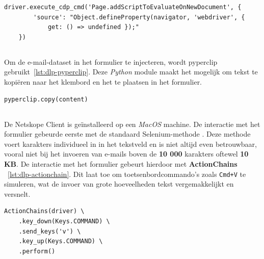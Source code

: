 \begin{lstlisting}[style=custompython,label={lst:dlp-stealth},caption={Best practice voor browserautomatisering}, captionpos=b]
    driver.execute_cdp_cmd('Page.addScriptToEvaluateOnNewDocument', {
        'source': "Object.defineProperty(navigator, 'webdriver', {
            get: () => undefined });"
    })
\end{lstlisting}

\subsection{}
\label{subsubsec:clipboard}

Om de e-mail-dataset in het formulier te injecteren, wordt pyperclip gebruikt~\ref{lst:dlp-pyperclip}.
Deze \textit{Python} module maakt het mogelijk om tekst te kopiëren naar het klembord en het te plaatsen in het formulier.

\begin{lstlisting}[style=custompython, label={lst:dlp-pyperclip}, caption={Clipboardmanipulatie met Pyperclip}, captionpos=b]
    pyperclip.copy(content)
\end{lstlisting}

\subsection{}
\label{subsubsec:gebruikersinteractie}

De Netskope Client is geïnstalleerd op een \textit{MacOS} machine. De interactie met het formulier gebeurde eerste met de standaard Selenium-methode \texttt{}. 
Deze methode voert karakters individueel in in het tekstveld en is niet altijd even betrouwbaar, vooral niet bij het invoeren van e-mails boven de \textbf{10 000} karakters oftewel \textbf{10 KB}.
De interactie met het formulier gebeurt hierdoor met \textbf{ActionChains} \autocite{Selenium2025ActionChains}~\ref{lst:dlp-actionchain}. 
Dit laat toe om toetsenbordcommando's zoals \texttt{Cmd+V} te simuleren, wat de invoer van grote hoeveelheden tekst vergemakkelijkt en versnelt.

\begin{lstlisting}[style=custompython,label={lst:dlp-actionchain},caption={gebruikersinteractie via ActionChains}, captionpos=b]
    ActionChains(driver) \
    .key_down(Keys.COMMAND) \
    .send_keys('v') \
    .key_up(Keys.COMMAND) \
    .perform()
\end{lstlisting}

